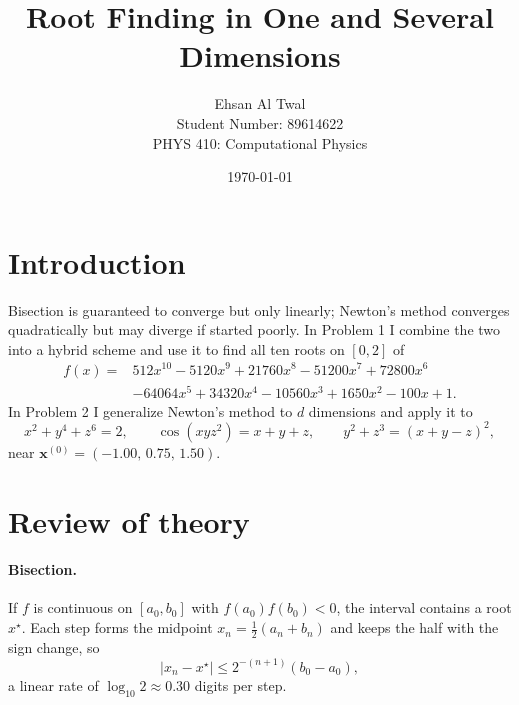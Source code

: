\documentclass[11pt]{article}
\title{Root Finding in One and Several Dimensions}
\author{Ehsan Al Twal \\ Student Number: 89614622 \\ PHYS 410: Computational Physics}
\date{\today}
\begin{document}
\maketitle

\section{Introduction}

Bisection is guaranteed to converge but only linearly; Newton's method
converges quadratically but may diverge if started poorly. In Problem 1 I
combine the two into a hybrid scheme and use it to find all ten roots on
$[0,2]$ of
%
\begin{align}
f(x) = {}& 512x^{10} - 5120x^{9} + 21760x^{8} - 51200x^{7} + 72800x^{6} \nonumber \\
         & - 64064x^{5} + 34320x^{4} - 10560x^{3} + 1650x^{2} - 100x + 1 .
\label{eq:poly}
\end{align}
%
In Problem 2 I generalize Newton's method to $d$ dimensions and apply it to
%
\begin{equation}
x^2 + y^4 + z^6 = 2 , \qquad
\cos\!\left(x y z^2\right) = x + y + z , \qquad
y^2 + z^3 = (x + y - z)^2 ,
\label{eq:sys}
\end{equation}
%
near $\mathbf{x}^{(0)} = (-1.00,\, 0.75,\, 1.50)$.

\section{Review of theory}

\paragraph{Bisection.} If $f$ is continuous on $[a_0,b_0]$ with
$f(a_0) f(b_0) < 0$, the interval contains a root $x^\star$. Each step forms
the midpoint $x_n = \tfrac{1}{2}(a_n + b_n)$ and keeps the half with the sign
change, so
%
\begin{equation}
|x_n - x^\star| \le 2^{-(n+1)}(b_0 - a_0) ,
\label{eq:biserr}
\end{equation}
%
a linear rate of $\log_{10} 2 \approx 0.30$ digits per step.
\end{document}
